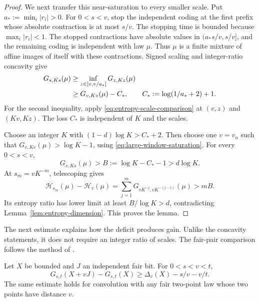 \begin{proof}
We next transfer this near-saturation to every smaller scale.
Put $a_*:=\min_i|r_i|>0$.  For $0<s<v$, stop the independent coding
at the first prefix whose absolute contraction is at most $s/v$.
The stopping time is bounded because $\max_i|r_i|<1$.
The stopped contractions have absolute values in
$(a_*s/v,s/v]$, and the remaining coding is independent with law $\mu$.
Thus $\mu$ is a finite mixture of affine images of itself with these
contractions.  Signed scaling and integer-ratio concavity give
\begin{align}
 G_{s,Ks}(\mu)
 &\ge\inf_{z\in[v,v/a_*]}G_{z,Kz}(\mu)\notag\\
 &\ge G_{v,Kv}(\mu)-C_* ,
 \qquad C_*:=\log(1/a_*+2)+1.
 \label{eq:stopped-scale-transfer}
\end{align}
For the second inequality, apply
\eqref{eq:entropy-scale-comparison} at $(v,z)$ and $(Kv,Kz)$.
The loss $C_*$ is independent of $K$ and the scales.

Choose an integer $K$ with $(1-d)\log K>C_*+2$.
Then choose one $v=v_n$ such that
$G_{v,Kv}(\mu)>\log K-1$, using
\eqref{eq:large-window-saturation}.  For every $0<s<v$,
\[
 G_{s,Ks}(\mu)>B:=\log K-C_*-1>d\log K.
\]
At $s_m=vK^{-m}$, telescoping gives
\[
 \mathcal H_{s_m}(\mu)-\mathcal H_v(\mu)
 =\sum_{j=1}^mG_{vK^{-j},vK^{-(j-1)}}(\mu)>mB.
\]
Its entropy ratio has lower limit at least $B/\log K>d$, contradicting
Lemma~\ref{lem:entropy-dimension}.  This proves the lemma.
\end{proof}

The next estimate explains how the deficit produces gain.  Unlike the
concavity statements, it does not require an integer ratio of scales.
The fair-pair comparison follows the method of
\cite[Proposition~20 and Lemma~22]{VarjuAbsolute2019}.

\begin{lemma}\label{lem:two-point}
Let $X$ be bounded and $J$ an independent fair bit.  For $0<s<v<t$,
\begin{equation}\label{eq:two-point-gain}
 G_{s,t}(X+vJ)-G_{s,t}(X)
 \ge\Delta_v(X)-s/v-v/t.
\end{equation}
The same estimate holds for convolution with any fair two-point law
whose two points have distance $v$.
\end{lemma}

